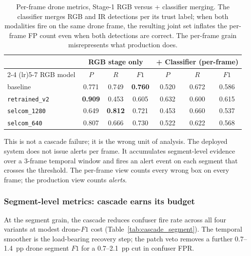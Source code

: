\begin{table}[htbp]
    \centering
    \caption{Per-frame drone metrics, Stage-1 RGB versus + classifier merging. The classifier merges RGB and IR detections per its trust label; when both modalities fire on the same drone frame, the resulting joint set inflates the per-frame FP count even when both detections are correct. The per-frame grain misrepresents what production does.}
    \label{tab:cascade_perframe}
    \begin{tabular}{lcccccc}
        \toprule
        & \multicolumn{3}{c}{RGB stage only} & \multicolumn{3}{c}{+ Classifier (per-frame)} \\
        \cmidrule(lr){2-4} \cmidrule(lr){5-7}
        RGB model & $P$ & $R$ & $F1$ & $P$ & $R$ & $F1$ \\
        \midrule
        baseline           & 0.771 & 0.749 & \textbf{0.760} & 0.520 & 0.672 & 0.586 \\
        \texttt{retrained\_v2} & \textbf{0.909} & 0.453 & 0.605 & 0.632 & 0.600 & 0.615 \\
        \texttt{selcom\_1280}  & 0.649 & \textbf{0.812} & 0.721 & 0.453 & 0.660 & 0.537 \\
        \texttt{selcom\_640}   & 0.807 & 0.666 & 0.730 & 0.522 & 0.622 & 0.568 \\
        \bottomrule
    \end{tabular}
\end{table}

This is not a cascade failure; it is the wrong unit of analysis. The deployed system does not issue alerts per frame. It accumulates segment-level evidence over a 3-frame temporal window and fires an alert event on each segment that crosses the threshold. The per-frame view counts every wrong box on every frame; the production view counts \emph{alerts}.

\subsubsection{Segment-level metrics: cascade earns its budget}

At the segment grain, the cascade reduces confuser fire rate across all four variants at modest drone-$F1$ cost (Table~\ref{tab:cascade_segment}). The temporal smoother is the load-bearing recovery step; the patch veto removes a further 0.7--1.4~pp drone segment $F1$ for a 0.7--2.1~pp cut in confuser FPR.

